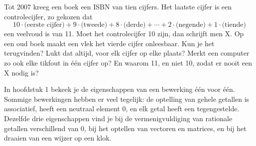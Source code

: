 %


\begin{probleem}
Tot 2007 kreeg een boek een ISBN van tien cijfers. Het laatste cijfer is een controlecijfer, zo gekozen dat
\[10 \cdot \text{(eerste cijfer)} + 9 \cdot \text{(tweede)} + 8 \cdot \text{(derde)} + \cdots + 2 \cdot \text{(negende)} + 1 \cdot \text{(tiende)}\]
een veelvoud is van 11. Moet het controlecijfer 10 zijn, dan schrijft men X. Op een oud boek maakt een vlek het vierde cijfer onleesbaar. Kun je het terugvinden? Lukt dat altijd, voor elk cijfer op elke plaats? Merkt een computer zo ook elke tikfout in één cijfer op? En waarom 11, en niet 10, zodat er nooit een X nodig is?

\end{probleem}


In hoofdstuk 1 bekeek je de eigenschappen van een bewerking één voor één. Sommige bewerkingen hebben er veel tegelijk: de optelling van gehele getallen is associatief, heeft een neutraal element 0, en elk getal heeft een tegengestelde. Dezelfde drie eigenschappen vind je bij de vermenigvuldiging van rationale getallen verschillend van 0, bij het optellen van vectoren en matrices, en bij het draaien van een wijzer op een klok.

